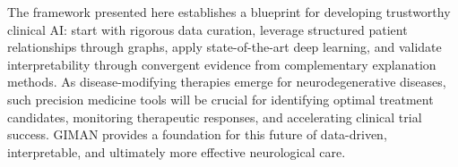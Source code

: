 The framework presented here establishes a blueprint for developing trustworthy clinical AI: start with rigorous data curation, leverage structured patient relationships through graphs, apply state-of-the-art deep learning, and validate interpretability through convergent evidence from complementary explanation methods. As disease-modifying therapies emerge for neurodegenerative diseases, such precision medicine tools will be crucial for identifying optimal treatment candidates, monitoring therapeutic responses, and accelerating clinical trial success. GIMAN provides a foundation for this future of data-driven, interpretable, and ultimately more effective neurological care.
